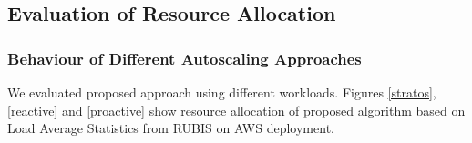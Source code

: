 \subsection{Evaluation of Resource Allocation}
\subsubsection{Behaviour of Different Autoscaling Approaches}
We evaluated proposed approach using different workloads. Figures \ref{stratos}, \ref{reactive} and \ref{proactive} show resource allocation of proposed algorithm based on Load Average Statistics from RUBIS on AWS deployment.
